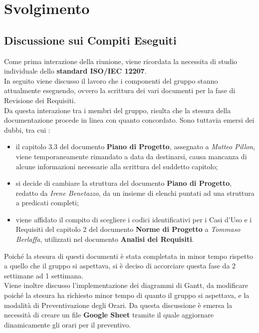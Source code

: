 \section{Svolgimento}
\subsection{Discussione sui Compiti Eseguiti}
	Come prima interazione della riunione, viene ricordata la necessita di studio individuale dello \textbf{standard ISO/IEC 12207}. \\
	In seguito viene discusso il lavoro che i componenti del gruppo stanno attualmente eseguendo, ovvero la scrittura dei vari documenti per la fase di Revisione dei Requisiti. \\
	Da questa interazione tra i membri del gruppo, risulta che la stesura della documentazione procede in linea con quanto concordato. Sono tuttavia emersi dei dubbi, tra cui : 
	\begin{itemize}
		\item il capitolo 3.3 del documento \textbf{Piano di Progetto}, assegnato a \textit{Matteo Pillon}, viene temporaneamente rimandato a data da destinarsi, causa mancanza di alcune informazioni necessarie alla scrittura del suddetto capitolo;
		\item si decide di cambiare la struttura del documento \textbf{Piano di Progetto}, redatto da \textit{Irene Benetazzo}, da un insieme di elenchi puntati ad una struttura a predicati completi;
		\item viene affidato il compito di scegliere i codici identificativi per i Casi d'Uso e i Requisiti del capitolo 2 del documento \textbf{Norme di Progetto} a \textit{Tommaso Berlaffa}, utilizzati nel documento \textbf{Analisi dei Requisiti}.
	\end{itemize}
	Poiché la stesura di questi documenti è stata completata in minor tempo rispetto a quello che il gruppo si aspettava, si è deciso di accorciare questa fase da 2 settimane ad 1 settimana. \\
	Viene inoltre discusso l'implementazione dei diagrammi di Gantt, da modificare poiché la stesura ha richiesto minor tempo di quanto il gruppo si aspettava, e la modalità di Preventivazione degli Orari. Da questa discussione è emersa la necessità di creare un file \textbf{Google Sheet} tramite il quale aggiornare dinamicamente gli orari per il preventivo.
	
